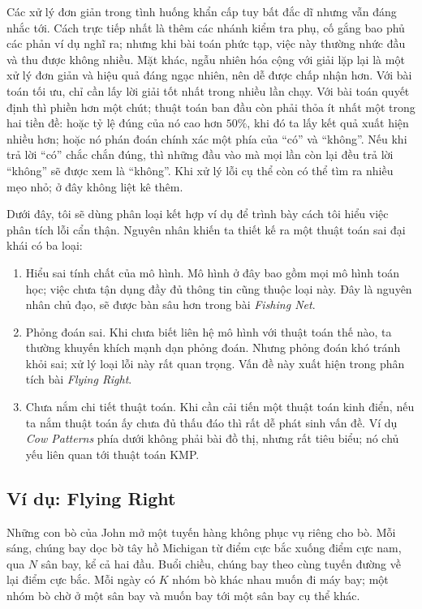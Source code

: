 \documentclass[11pt]{article}
\begin{document}
Các xử lý đơn giản trong tình huống khẩn cấp tuy bất đắc dĩ nhưng vẫn đáng
nhắc tới. Cách trực tiếp nhất là thêm các nhánh kiểm tra phụ, cố gắng bao phủ
các phản ví dụ nghĩ ra; nhưng khi bài toán phức tạp, việc này thường nhức đầu
và thu được không nhiều. Mặt khác, ngẫu nhiên hóa cộng với giải lặp lại là một
xử lý đơn giản và hiệu quả đáng ngạc nhiên, nên dễ được chấp nhận hơn. Với
bài toán tối ưu, chỉ cần lấy lời giải tốt nhất trong nhiều lần chạy. Với bài
toán quyết định thì phiền hơn một chút; thuật toán ban đầu còn phải thỏa ít
nhất một trong hai tiền đề: hoặc tỷ lệ đúng của nó cao hơn \(50\%\), khi đó ta
lấy kết quả xuất hiện nhiều hơn; hoặc nó phán đoán chính xác một phía của
``có'' và ``không''. Nếu khi trả lời ``có'' chắc chắn đúng, thì những đầu vào
mà mọi lần còn lại đều trả lời ``không'' sẽ được xem là ``không''. Khi xử lý
lỗi cụ thể còn có thể tìm ra nhiều mẹo nhỏ; ở đây không liệt kê thêm.

Dưới đây, tôi sẽ dùng phân loại kết hợp ví dụ để trình bày cách tôi hiểu việc
phân tích lỗi cẩn thận. Nguyên nhân khiến ta thiết kế ra một thuật toán sai
đại khái có ba loại:
\begin{enumerate}
  \item Hiểu sai tính chất của mô hình. Mô hình ở đây bao gồm mọi mô hình toán
  học; việc chưa tận dụng đầy đủ thông tin cũng thuộc loại này. Đây là nguyên
  nhân chủ đạo, sẽ được bàn sâu hơn trong bài \textit{Fishing Net}.
  \item Phỏng đoán sai. Khi chưa biết liên hệ mô hình với thuật toán thế nào,
  ta thường khuyến khích mạnh dạn phỏng đoán. Nhưng phỏng đoán khó tránh khỏi
  sai; xử lý loại lỗi này rất quan trọng. Vấn đề này xuất hiện trong phân tích
  bài \textit{Flying Right}.
  \item Chưa nắm chi tiết thuật toán. Khi cần cải tiến một thuật toán kinh
  điển, nếu ta nắm thuật toán ấy chưa đủ thấu đáo thì rất dễ phát sinh vấn đề.
  Ví dụ \textit{Cow Patterns} phía dưới không phải bài đồ thị, nhưng rất tiêu
  biểu; nó chủ yếu liên quan tới thuật toán KMP.
\end{enumerate}

\subsection{Ví dụ: Flying Right}

Những con bò của John mở một tuyến hàng không phục vụ riêng cho bò. Mỗi sáng,
chúng bay dọc bờ tây hồ Michigan từ điểm cực bắc xuống điểm cực nam, qua
\(N\) sân bay, kể cả hai đầu. Buổi chiều, chúng bay theo cùng tuyến đường về
lại điểm cực bắc. Mỗi ngày có \(K\) nhóm bò khác nhau muốn đi máy bay; một
nhóm bò chờ ở một sân bay và muốn bay tới một sân bay cụ thể khác.
\end{document}
